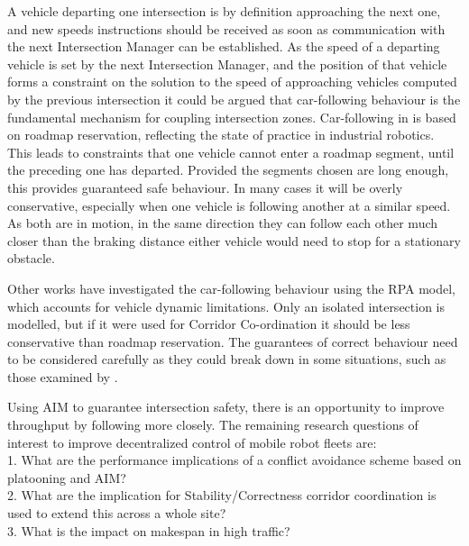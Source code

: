 \documentclass[runningheads]{llncs}
\begin{document}
A vehicle departing one intersection is by definition approaching the next one, and new speeds instructions should be received as soon as communication with the next Intersection Manager can be established. As the speed of a departing vehicle is set by the next Intersection Manager, and the position of that vehicle forms a constraint on the solution to the speed of approaching vehicles computed by the previous intersection it could be argued that car-following behaviour is the fundamental mechanism for coupling intersection zones. Car-following in \cite{Digani2019} is based on roadmap reservation, reflecting the state of practice in industrial robotics. This leads to constraints that one vehicle cannot enter a roadmap segment, until the preceding one has departed. Provided the segments chosen are long enough, this provides guaranteed safe behaviour. In many cases it will be overly conservative, especially when one vehicle is following another at a similar speed. As both are in motion, in the same direction they can follow each other much closer than the braking distance either vehicle would need to stop for a stationary obstacle.

Other works have investigated the car-following behaviour \cite{Bichiou2019} using the RPA model, which accounts for vehicle dynamic limitations. Only an isolated intersection is modelled, but if it were used for Corridor Co-ordination it should be less conservative than roadmap reservation. The guarantees of correct behaviour need to be considered carefully as they could break down in some situations, such as those examined by \cite{Du2020}.


Using AIM to guarantee intersection safety, there is an opportunity to improve throughput by following more closely. The remaining research questions of interest to improve decentralized control of mobile robot fleets are:\\
1.  What are the performance implications of a conflict avoidance scheme based on platooning and AIM? \\
2. What are the implication for Stability/Correctness corridor coordination is used to extend this across a whole site? \\
3.  What is the impact on makespan in high traffic?\\
\end{document}
